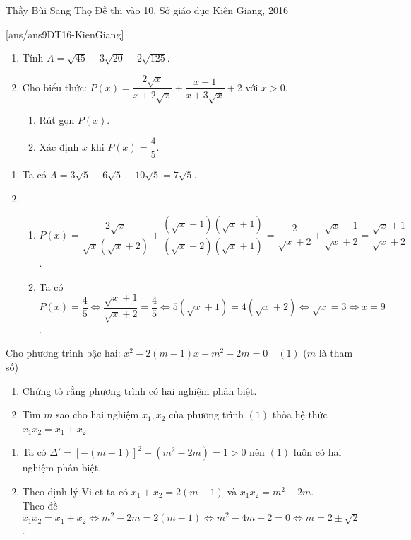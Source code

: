 \begin{name}
{Thầy  Bùi Sang Thọ}
{Đề thi vào 10, Sở giáo dục Kiên Giang, 2016}
\end{name}
\setcounter{ex}{0}
[ans/ans9DT16-KienGiang]
\begin{ex}%
    \hfill
    \begin{enumerate}
        \item Tính $A=\sqrt{45}-3\sqrt{20}+2\sqrt{125}$.
        \item Cho biểu thức: $P(x)=\dfrac{2\sqrt{x}}{x+2\sqrt{x}}+\dfrac{x-1}{x+3\sqrt{x}}+2$ với $x>0$.
\begin{enumerate}
\item Rút gọn $P(x)$.
\item Xác định $x$ khi $P(x)=\dfrac{4}{5}$.
\end{enumerate}
    \end{enumerate}
\loigiai
    {
    \begin{enumerate}
        \item Ta có $A=3\sqrt{5}-6\sqrt{5}+10\sqrt{5}=7\sqrt{5}$.
        \item 
\begin{enumerate}
\item $P(x)=\dfrac{2\sqrt{x}}{\sqrt{x}\left(\sqrt{x}+2\right)}+\dfrac{\left(\sqrt{x}-1\right)\left(\sqrt{x}+1\right)}{\left(\sqrt{x}+2\right)\left(\sqrt{x}+1\right)}=\dfrac{2}{\sqrt{x}+2}+\dfrac{\sqrt{x}-1}{\sqrt{x}+2}=\dfrac{\sqrt{x}+1}{\sqrt{x}+2}$.
\item Ta có $P(x)=\dfrac{4}{5}\Leftrightarrow\dfrac{\sqrt{x}+1}{\sqrt{x}+2}=\dfrac{4}{5}\Leftrightarrow 5\left(\sqrt{x}+1\right)=4\left(\sqrt{x}+2\right)\Leftrightarrow\sqrt{x}=3\Leftrightarrow x=9$.
\end{enumerate}
    \end{enumerate}
    }
\end{ex}

\begin{ex}%
Cho phương trình bậc hai: $x^2-2(m-1)x+m^2-2m=0\quad (1)$ ($m$ là tham số)
    \begin{enumerate}    
        \item Chứng tỏ rằng phương trình có hai nghiệm phân biệt.
        \item Tìm $m$ sao cho hai nghiệm $x_1, x_2$ của phương trình $(1)$ thỏa hệ thức $x_1x_2=x_1+x_2$.
    \end{enumerate}
\loigiai
    {
    \begin{enumerate}
        \item Ta có $\Delta'=\left[-(m-1)\right]^2-\left(m^2-2m\right)=1>0$ nên $(1)$ luôn có hai nghiệm phân biệt.
        \item Theo định lý Vi-et ta có $x_1+x_2=2(m-1)$ và $x_1x_2=m^2-2m$.\\
Theo đề $x_1x_2=x_1+x_2\Leftrightarrow m^2-2m=2(m-1)\Leftrightarrow m^2-4m+2=0\Leftrightarrow m=2\pm\sqrt{2}$.
    \end{enumerate}
    }
\end{ex}

